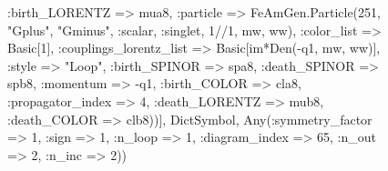 \documentclass{revtex4}
\begin{document}
\begin{figure}[!htb]
\begin{center}
{:birth_LORENTZ => mua8, :particle => FeAmGen.Particle(251, "Gplus", "Gminus", :scalar, :singlet, 1//1, mw, ww), :color_list => Basic[1], :couplings_lorentz_list => Basic[im*Den(-q1, mw, ww)], :style => "Loop", :birth_SPINOR => spa8, :death_SPINOR => spb8, :momentum => -q1, :birth_COLOR => cla8, :propagator_index => 4, :death_LORENTZ => mub8, :death_COLOR => clb8))], Dict{Symbol, Any}(:symmetry_factor => 1, :sign => 1, :n_loop => 1, :diagram_index => 65, :n_out => 2, :n_inc => 2)) 
}
\end{center}
\end{figure}
\end{document}
